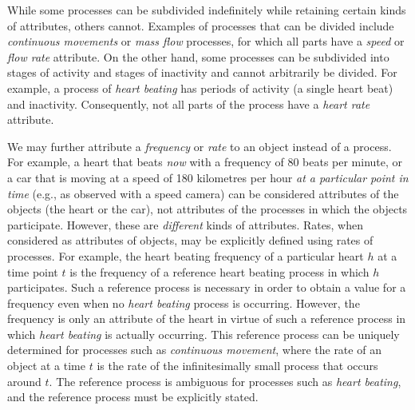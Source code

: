 \documentclass{bioinfo}
\begin{document}
While some processes can be subdivided indefinitely while retaining
certain kinds of attributes, others cannot.
Examples of processes that can be divided include {\em continuous
  movements} or {\em mass flow} processes, for which all parts have a
{\em speed} or {\em flow rate} attribute. On the other hand, some
processes can be subdivided into stages of activity and stages of
inactivity and cannot arbitrarily be divided. For example, a process
of {\em heart beating} has periods of activity (a single heart beat)
and inactivity. Consequently, not all parts of the process have a {\em
  heart rate} attribute.

We may further attribute a {\em frequency} or {\em rate} to an object
instead of a process. For example, a heart that beats {\em now} with a
frequency of 80 beats per minute, or a car that is moving at a speed
of 180 kilometres per hour {\em at a particular point in time} (e.g.,
as observed with a speed camera) can be considered attributes of the
objects (the heart or the car), not attributes of the processes in
which the objects participate. However, these are {\em different}
kinds of attributes. Rates, when considered as attributes of objects,
may be explicitly defined using rates of processes. For example, the
heart beating frequency of a particular heart $h$ at a time point $t$
is the frequency of a reference heart beating process in which $h$
participates. Such a reference process is necessary in order to obtain
a value for a frequency even when no {\em heart beating} process is
occurring. However, the frequency is only an attribute of the heart in
virtue of such a reference process in which {\em heart beating} is
actually occurring.  This reference process can be uniquely determined
for processes such as {\em continuous movement}, where the rate of an
object at a time $t$ is the rate of the infinitesimally small process
that occurs around $t$. The reference process is ambiguous for
processes such as {\em heart beating}, and the reference process must
be explicitly stated.


\end{document}
